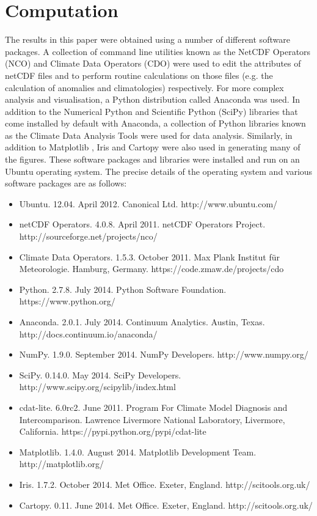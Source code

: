 \section{Computation}\label{s:computation}

The results in this paper were obtained using a number of different software packages. A collection of command line utilities known as the NetCDF Operators (NCO) and Climate Data Operators (CDO) were used to edit the attributes of netCDF files and to perform routine calculations on those files (e.g. the calculation of anomalies and climatologies) respectively. For more complex analysis and visualisation, a Python distribution called Anaconda was used. In addition to the Numerical Python \citep[NumPy;][]{VanDerWalt2011} and Scientific Python (SciPy) libraries that come installed by default with Anaconda, a collection of Python libraries known as the Climate Data Analysis Tools \citep[CDAT;][]{Doutriaux2009} were used for data analysis. Similarly, in addition to Matplotlib \citep[the default Python plotting library;][]{Hunter2007}, Iris and Cartopy were also used in generating many of the figures. These software packages and libraries were installed and run on an Ubuntu operating system. The precise details of the operating system and various software packages are as follows:
\begin{itemize}
\item Ubuntu. 12.04. April 2012. Canonical Ltd. http://www.ubuntu.com/
\item netCDF Operators. 4.0.8. April 2011. netCDF Operators Project. http://sourceforge.net/projects/nco/
\item Climate Data Operators. 1.5.3. October 2011. Max Plank Institut f{\"u}r Meteorologie. Hamburg, Germany. https://code.zmaw.de/projects/cdo
\item Python. 2.7.8. July 2014. Python Software Foundation. https://www.python.org/
\item Anaconda. 2.0.1. July 2014. Continuum Analytics. Austin, Texas. http://docs.continuum.io/anaconda/
\item NumPy. 1.9.0. September 2014. NumPy Developers. http://www.numpy.org/
\item SciPy. 0.14.0. May 2014. SciPy Developers. http://www.scipy.org/scipylib/index.html
\item cdat-lite. 6.0rc2. June 2011. Program For Climate Model Diagnosis and Intercomparison. Lawrence Livermore National Laboratory, Livermore, California. https://pypi.python.org/pypi/cdat-lite
\item Matplotlib. 1.4.0. August 2014. Matplotlib Development Team. http://matplotlib.org/
\item Iris. 1.7.2. October 2014. Met Office. Exeter, England. http://scitools.org.uk/
\item Cartopy. 0.11. June 2014. Met Office. Exeter, England. http://scitools.org.uk/
\end{itemize}

